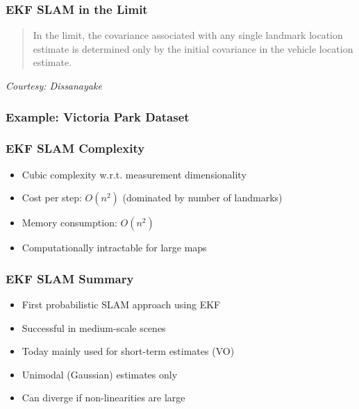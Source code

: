\begin{frame}
    \frametitle{EKF SLAM in the Limit}

    \begin{quote}
    In the limit, the covariance associated with any single landmark location estimate is determined only by the initial covariance in the vehicle location estimate.
    \end{quote}
    \textit{Courtesy: Dissanayake}
\end{frame}

\begin{frame}
    \frametitle{Example: Victoria Park Dataset}

\end{frame}

\begin{frame}
    \frametitle{EKF SLAM Complexity}

    \begin{itemize}
    \item Cubic complexity w.r.t. measurement dimensionality
    \item Cost per step: $O(n^2)$ (dominated by number of landmarks)
    \item Memory consumption: $O(n^2)$
    \item Computationally intractable for large maps
    \end{itemize}
\end{frame}

\begin{frame}
    \frametitle{EKF SLAM Summary}

    \begin{itemize}
    \item First probabilistic SLAM approach using EKF
    \item Successful in medium-scale scenes
    \item Today mainly used for short-term estimates (VO)
    \item Unimodal (Gaussian) estimates only
    \item Can diverge if non-linearities are large
    \end{itemize}
\end{frame}

